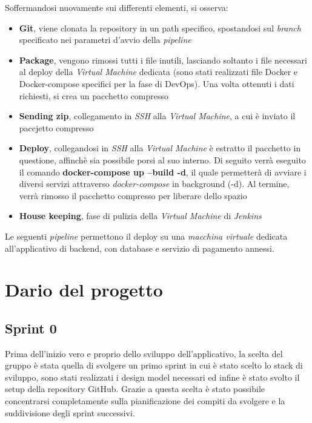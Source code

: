 \documentclass{article}
\begin{document}
Soffermandosi nuovamente sui differenti elementi, si osserva:
\begin{itemize}[label = {-}]
    \itemsep0em
    \item \textbf{Git}, viene clonata la repository in un path specifico, spostandosi sul \textit{branch} specificato nei parametri d'avvio della \textit{pipeline}
    \item \textbf{Package}, vengono rimossi tutti i file inutili, lasciando soltanto i file necessari al deploy della \textit{Virtual Machine} dedicata (sono stati realizzati file Docker e Docker-compose specifici per la fase di DevOps). Una volta ottenuti i dati richiesti, si crea un pacchetto compresso
    \item \textbf{Sending zip}, collegamento in \textit{SSH} alla \textit{Virtual Machine}, a cui è inviato il paccjetto compresso
    \item \textbf{Deploy}, collegandosi in \textit{SSH} alla \textit{Virtual Machine} è estratto il pacchetto in questione, affinchè sia possibile porsi al suo interno. Di seguito verrà eseguito il comando \textbf{docker-compose up --build -d}, il quale permetterà di avviare i diversi servizi attraverso \textit{docker-compose} in background (-d). Al termine, verrà rimosso il pacchetto compresso per liberare dello spazio
    \item \textbf{House keeping}, fase di pulizia della \textit{Virtual Machine} di \textit{Jenkins}
\end{itemize}
Le seguenti \textit{pipeline} permettono il deploy su una \textit{macchina virtuale} dedicata all'applicativo di backend, con database e servizio di pagamento annessi.

\clearpage
\section{Dario del progetto}

\subsection{Sprint 0}
Prima dell'inizio vero e proprio dello sviluppo dell'applicativo, la scelta del gruppo è stata quella di svolgere un primo sprint in cui è stato scelto lo stack di sviluppo, sono stati realizzati i design model necessari ed infine è stato svolto il setup della repository GitHub. Grazie a questa scelta è stato possibile concentrarsi completamente sulla pianificazione dei compiti da svolgere e la suddivisione degli sprint successivi.
\end{document}
